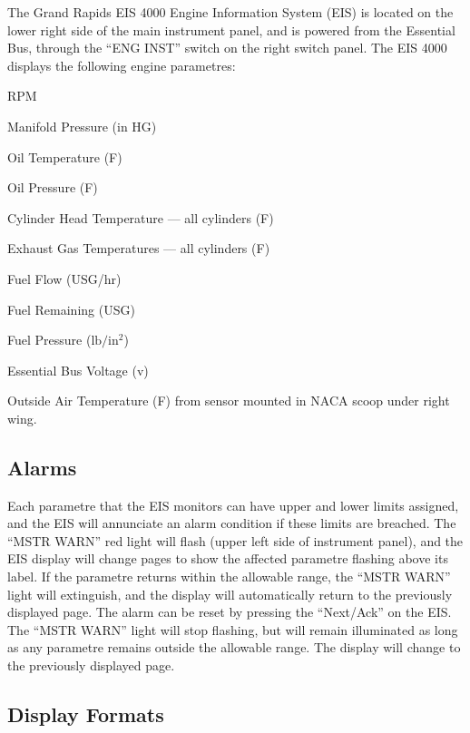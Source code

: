 The Grand Rapids EIS 4000 Engine Information System (EIS) is located on the lower right side of the main instrument panel, and is powered from the Essential Bus, through the ``ENG INST'' switch on the right switch panel. The EIS 4000 displays the following engine parametres:
\begin{itemize*}
	\item RPM 
	\item Manifold Pressure (in HG) 
	\item Oil Temperature (\textdegree F) 
	\item Oil Pressure (\textdegree F) 
	\item Cylinder Head Temperature --- all cylinders (\textdegree F) 
	\item Exhaust Gas Temperatures --- all cylinders (\textdegree F) 
	\item Fuel Flow (USG/hr) 
	\item Fuel Remaining (USG) 
	\item Fuel Pressure ($\mathrm{lb/in^{2}}$) 
	\item Essential Bus Voltage (v)
	\item Outside Air Temperature (\textdegree F) from sensor mounted in NACA scoop under right wing. 
\end{itemize*}

\subsection*{Alarms}

Each parametre that the EIS monitors can have upper and lower limits assigned, and the EIS will annunciate an alarm condition if these limits are breached. The ``MSTR WARN'' red light will flash (upper left side of instrument panel), and the EIS display will change pages to show the affected parametre flashing above its label. If the parametre returns within the allowable range, the ``MSTR WARN'' light will extinguish, and the display will automatically return to the previously displayed page. The alarm can be reset by pressing the ``Next/Ack'' on the EIS. The ``MSTR WARN'' light will stop flashing, but will remain illuminated as long as any parametre remains outside the allowable range. The display will change to the previously displayed page.

\subsection*{Display Formats}

